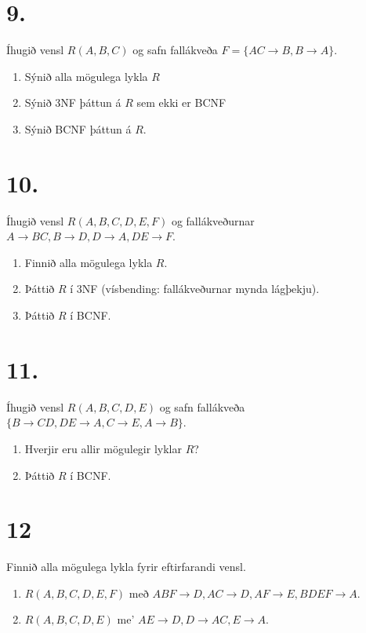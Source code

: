\documentclass{article}
\newcommand{\enum}{\begin{enumerate}[label = \alph*.]}
\begin{document}
\section{9.}
Íhugið vensl $R(A, B, C)$ og safn fallákveða $F = \{AC \rightarrow B, B \rightarrow A\}$.

\enum
\item Sýnið alla mögulega lykla $R$
\item Sýnið 3NF þáttun á $R$ sem ekki er BCNF
\item Sýnið BCNF þáttun á $R$.
\end{enumerate}

\vspace{1cm}

\section{10.}
Íhugið vensl $R(A, B, C, D, E, F)$ og fallákveðurnar
$A \rightarrow BC, B \rightarrow D, D \rightarrow A, DE \rightarrow F$.

\enum
\item  Finnið alla mögulega lykla $R$.
\item  Þáttið $R$ í 3NF (vísbending: fallákveðurnar mynda lágþekju).
\item  Þáttið $R$ í BCNF. 
\end{enumerate}

\vspace{1cm}

\section{11.}
Íhugið vensl $R(A, B, C, D, E)$ og safn fallákveða
$\{B \rightarrow CD, DE \rightarrow A, C \rightarrow E, A \rightarrow B\}$.

\enum
\item Hverjir eru allir mögulegir lyklar $R$?
\item Þáttið $R$ í BCNF.
\end{enumerate}


\vspace{1cm}


\section{12}
Finnið alla mögulega lykla fyrir eftirfarandi vensl.
\enum
\item $R(A,B,C,D,E,F)$ með $ABF \rightarrow D, AC \rightarrow D, AF \rightarrow E, BDEF \rightarrow A$.
\item $R(A,B,C,D,E)$ me' $AE \rightarrow D, D \rightarrow AC, E \rightarrow A$.
\end{enumerate}
\end{document}
